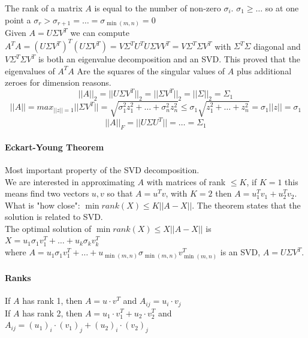\documentclass[10pt]{report}
\begin{document}
The rank of a matrix $A$ is equal to the number of non-zero $\sigma_i$. $\sigma_1\geq \ldots$ so at one point a $\sigma_r > \sigma_{r+1} = \ldots = \sigma_{\min(m,n)} = 0$\\
Given $A = U\Sigma V^T$ we can compute $A^T A = (U\Sigma V^T)^T(U\Sigma V^T) = V\Sigma^T U^T U \Sigma VV^T = V\Sigma^T \Sigma V^T$ with $\Sigma^T \Sigma$ diagonal and $V\Sigma^T \Sigma V^T$ is both an eigenvalue decomposition and an SVD. This proved that the eigenvalues of $A^T A$ Are the squares of the singular values of $A$ plus additional zeroes for dimension reasons.
$$||A||_2 = ||U\Sigma V^T||_2 = ||\Sigma V^T||_2 = ||\Sigma||_2 = \Sigma_1$$
$$||A|| = max_{||z|| = 1} ||\Sigma V^T|| = \sqrt{\sigma_1^2 z_1^2 + \ldots + \sigma_n^2 z_n^2} \leq \sigma_1 \sqrt{z_1^2 +\ldots + z_n^2} = \sigma_1||z|| = \sigma_1$$
$$||A||_F = ||U\Sigma U^T|| = \ldots = \Sigma_1$$
\paragraph{Eckart-Young Theorem} Most important property of the SVD decomposition.\\
We are interested in approximating $A$ with matrices of rank $\leq K$, if $K = 1$ this means find two vectors $u, v$ so that $A = u^T v$, with $K=2$ then $A = u_1^T v_1 + u_2^T v_2$. What is "how close": $\min{rank(X) \leq K}||A - X||$. The theorem states that the solution is related to SVD.\\
The optimal solution of $\min{rank(X) \leq X}||A - X||$ is $X = u_1\sigma_1 v_1^T + \ldots + u_k\sigma_k v_k^T$\\where $A = u_1\sigma_1 v_1^T + \ldots + u_{\min(m,n)}\sigma_{\min(m,n)} v_{\min(m,n)}^T$ is an SVD, $A = U\Sigma V^T$.
\paragraph{Ranks} If $A$ has rank 1, then $A = u\cdot v^T$ and $A_{ij} = u_i\cdot v_j$\\
If $A$ has rank 2, then $A= u_1\cdot v_1^T + u_2\cdot v_2^T$ and $A_{ij} = (u_1)_i\cdot (v_1)_j + (u_2)_i\cdot (v_2)_j$
\end{document}
